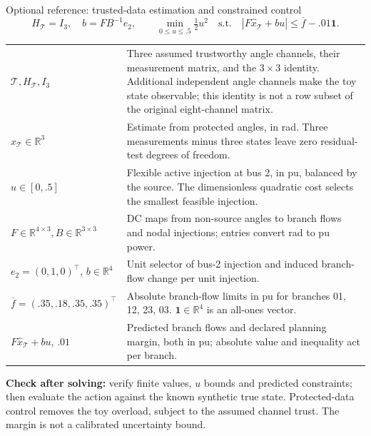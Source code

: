 \begin{frame}[t]{Optional reference: trusted-data estimation and constrained control}
\[
H_{\mathcal T}=I_3,\quad
b=FB^{-1}e_2,\qquad
\min_{0\leq u\leq .5}\tfrac12u^2
\quad\text{s.t.}\quad |F\hat x_{\mathcal T}+bu|\leq\overline f-.01\mathbf1.
\]
\begin{tabular}{@{}>{\raggedright\arraybackslash}p{.25\linewidth}>{\raggedright\arraybackslash}p{.68\linewidth}@{}}
$\mathcal T,H_{\mathcal T},I_3$ & Three assumed trustworthy angle channels, their measurement matrix, and the $3\times3$ identity. Additional independent angle channels make the toy state observable; this identity is not a row subset of the original eight-channel matrix. \\
$\hat x_{\mathcal T}\in\mathbb R^3$ & Estimate from protected angles, in rad. Three measurements minus three states leave zero residual-test degrees of freedom. \\
$u\in[0,.5]$ & Flexible active injection at bus 2, in pu, balanced by the source. The dimensionless quadratic cost selects the smallest feasible injection. \\
$F\in\mathbb R^{4\times3},B\in\mathbb R^{3\times3}$ & DC maps from non-source angles to branch flows and nodal injections; entries convert rad to pu power. \\
$e_2=(0,1,0)^\top$, $b\in\mathbb R^4$ & Unit selector of bus-2 injection and induced branch-flow change per unit injection. \\
$\overline f=(.35,.18,.35,.35)^\top$ & Absolute branch-flow limits in pu for branches 01, 12, 23, 03. $\mathbf1\in\mathbb R^4$ is an all-ones vector. \\
$F\hat x_{\mathcal T}+bu$, $.01$ & Predicted branch flows and declared planning margin, both in pu; absolute value and inequality act per branch. \\
\end{tabular}
\par\smallskip\textbf{Check after solving:} verify finite values, $u$ bounds and predicted constraints; then evaluate the action against the known synthetic true state. Protected-data control removes the toy overload, subject to the assumed channel trust. The margin is not a calibrated uncertainty bound.
\end{frame}

